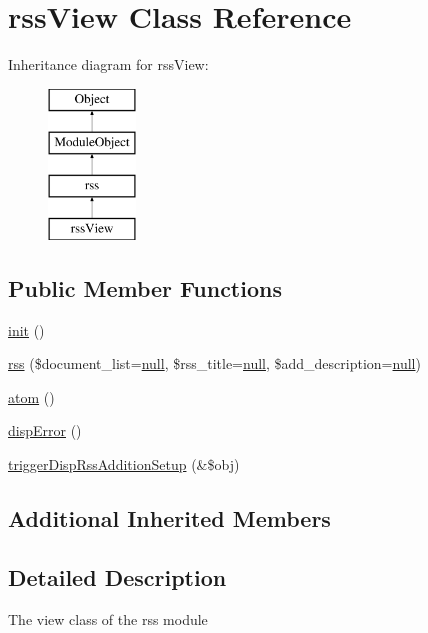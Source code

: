 \hypertarget{classrssView}{}\section{rss\+View Class Reference}
\label{classrssView}
Inheritance diagram for rss\+View\+:\begin{figure}[H]
\begin{center}
\leavevmode
\includegraphics[height=4.000000cm]{classrssView}
\end{center}
\end{figure}
\subsection*{Public Member Functions}
\begin{DoxyCompactItemize}
\item 
\hyperlink{classrssView_af438b469cdde5b47ced8ada179d56c4d}{init} ()
\item 
\hyperlink{classrssView_a769dbe1bd0a000160ac6b4529b645dc7}{rss} (\$document\+\_\+list=\hyperlink{modernizr_8min_8js_a286f9ec831c5e676eeb493248eab9575}{null}, \$rss\+\_\+title=\hyperlink{modernizr_8min_8js_a286f9ec831c5e676eeb493248eab9575}{null}, \$add\+\_\+description=\hyperlink{modernizr_8min_8js_a286f9ec831c5e676eeb493248eab9575}{null})
\item 
\hyperlink{classrssView_a4c0453c52a946c2fe3643e099235eb62}{atom} ()
\item 
\hyperlink{classrssView_a1e6808d03030aa6f6ff61083798c2422}{disp\+Error} ()
\item 
\hyperlink{classrssView_ac17108a08e3f3c1ed1070fa876cffc15}{trigger\+Disp\+Rss\+Addition\+Setup} (\&\$obj)
\end{DoxyCompactItemize}
\subsection*{Additional Inherited Members}


\subsection{Detailed Description}
The view class of the rss module


